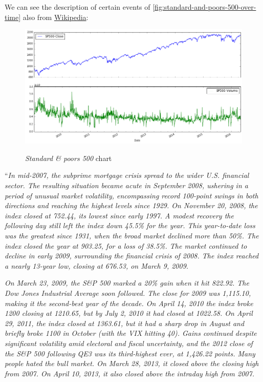 We can see the description of certain events of
\autoref{fig:standard-and-poors-500-over-time} also from
\href{https://en.wikipedia.org/wiki/S\%26P_500_Index}{Wikipedia}:

\begin{figure}[bth]
  \myfloatalign
  {\includegraphics[width=1\linewidth]
    {gfx/standard-and-poors-500-over-time}}
  \caption{\textit{Standard \& poors 500}
    chart}
  \label{fig:standard-and-poors-500-over-time}
\end{figure}

``\textit{In mid-2007, the subprime mortgage crisis spread to the wider
  U.S. financial sector. The resulting situation became acute in
  September 2008, ushering in a period of unusual market volatility,
  encompassing record 100-point swings in both directions and reaching
  the highest levels since 1929. On November 20, 2008, the index
  closed at 752.44, its lowest since early 1997. A modest recovery the
  following day still left the index down 45.5\% for the year. This
  year-to-date loss was the greatest since 1931, when the broad market
  declined more than 50\%. The index closed the year at 903.25, for a
  loss of 38.5\%. The market continued to decline in early 2009,
  surrounding the financial crisis of 2008. The index reached a nearly
  13-year low, closing at 676.53, on March 9, 2009.}

\textit{On March 23, 2009, the S\&P 500 marked a 20\% gain when it hit
  822.92. The Dow Jones Industrial Average soon followed. The close
  for 2009 was 1,115.10, making it the second-best year of the decade.
  On April 14, 2010 the index broke 1200 closing at 1210.65, but by
  July 2, 2010 it had closed at 1022.58. On April 29, 2011, the index
  closed at 1363.61, but it had a sharp drop in August and briefly
  broke 1100 in October (with the VIX hitting 40). Gains continued
  despite significant volatility amid electoral and fiscal
  uncertainty, and the 2012 close of the S\&P 500 following QE3 was
  its third-highest ever, at 1,426.22 points. Many people hated the
  bull market. On March 28, 2013, it closed above the closing high
  from 2007. On April 10, 2013, it also closed above the intraday high
  from 2007.}

